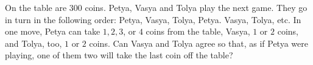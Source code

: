 On the table are $300$ coins. Petya, Vasya and Tolya play the next game. They go in turn in the following order: Petya, Vasya, Tolya, Petya. Vasya, Tolya, etc. In one move, Petya can take $1, 2, 3$, or $4$ coins from the table, Vasya, $1$ or $2$ coins, and Tolya, too, $1$ or $2$ coins. Can Vasya and Tolya agree so that, as if Petya were playing, one of them two will take the last coin off the table?
